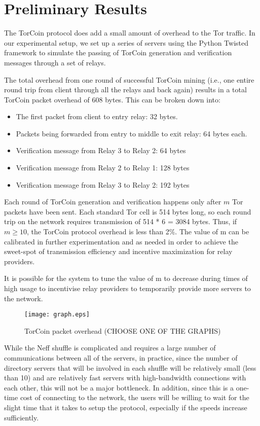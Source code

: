 \section{Preliminary Results}

The TorCoin protocol does add a small amount of overhead to the Tor traffic.
In our experimental setup, we set up a series of servers using the Python
Twisted framework to simulate the passing of TorCoin generation and
verification messages through a set of relays.

The total overhead from one round of successful TorCoin mining (i.e., one entire round trip from client through all the relays and back again) results in a total TorCoin packet overhead of 608 bytes. This can be broken down into: 

\begin{itemize}
\item The first packet from client to entry relay: 32 bytes.
\item Packets being forwarded from entry to middle to exit relay: 64 bytes each.
\item Verification message from Relay 3 to Relay 2: 64 bytes
\item Verification message from Relay 2 to Relay 1: 128 bytes
\item Verification message from Relay 3 to Relay 2: 192 bytes
\end{itemize}

Each round of TorCoin generation and verification happens only after $m$ Tor
packets have been sent. Each standard Tor cell is 514 bytes long, so each
round trip on the network requires transmission of 514 * 6 = 3084 bytes. Thus,
if $m \geq 10$, the TorCoin protocol overhead is less than 2\%. The value of m
can be calibrated in further experimentation and as needed in order to achieve
the sweet-spot of transmission efficiency and incentive maximization for relay
providers.

It is possible for the system to tune the value of m to decrease during times
of high usage to incentivise relay providers to temporarily provide more
servers to the network.

\begin{figure}
  \centering
    \texttt{[image: graph.eps]}
  \caption{TorCoin packet overhead (CHOOSE ONE OF THE GRAPHS)}
\end{figure}

While the Neff shuffle is complicated and requires a large number of
communications between all of the servers, in practice, since the number of
directory servers that will be involved in each shuffle will be relatively
small (less than 10) and are relatively fast servers with high-bandwidth
connections with each other, this will not be a major bottleneck. In addition,
since this is a one-time cost of connecting to the network, the users will be
willing to wait for the slight time that it takes to setup the protocol,
especially if the speeds increase sufficiently.
